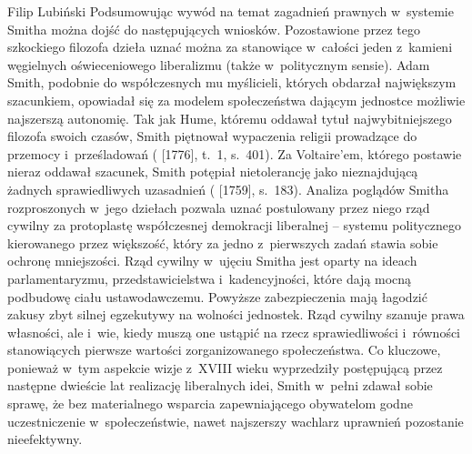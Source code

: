 \begin{artplenv}{Filip Lubiński}
Podsumowując wywód na temat zagadnień prawnych w~systemie Smitha można dojść do następujących wniosków.
Pozostawione przez tego szkockiego filozofa dzieła uznać można za stanowiące w~całości jeden z~kamieni węgielnych oświeceniowego
liberalizmu (także w~politycznym sensie). Adam Smith, podobnie do współczesnych mu myślicieli, których obdarzał
największym szacunkiem, opowiadał się za modelem społeczeństwa dającym jednostce możliwie najszerszą autonomię. Tak jak
Hume, któremu oddawał tytuł najwybitniejszego filozofa swoich czasów, Smith piętnował wypaczenia religii prowadzące do
przemocy i~prześladowań
(\cite{smith_badania_2007} [1776], t.~1, s.~401).
Za Voltaire'em, którego postawie
nieraz oddawał szacunek, Smith potępiał nietolerancję jako nieznajdującą żadnych sprawiedliwych uzasadnień
(\cite{smith_teoria_1989} [1759], s.~183).
Analiza poglądów Smitha rozproszonych w~jego dziełach pozwala
uznać postulowany przez niego rząd cywilny za protoplastę współczesnej demokracji liberalnej -- systemu politycznego
kierowanego przez większość, który za jedno z~pierwszych zadań stawia sobie ochronę mniejszości. Rząd cywilny w~ujęciu
Smitha jest oparty na ideach parlamentaryzmu, przedstawicielstwa i~kadencyjności, które dają mocną podbudowę ciału
ustawodawczemu. Powyższe zabezpieczenia mają łagodzić zakusy zbyt silnej egzekutywy na wolności jednostek. Rząd cywilny
szanuje prawa własności, ale i~wie, kiedy muszą one ustąpić na rzecz sprawiedliwości i~równości stanowiących pierwsze
wartości zorganizowanego społeczeństwa. Co kluczowe, ponieważ w~tym aspekcie wizje z~XVIII wieku wyprzedziły
postępującą przez następne dwieście lat realizację liberalnych idei, Smith w~pełni zdawał sobie sprawę, że bez
materialnego wsparcia zapewniającego obywatelom godne uczestniczenie w~społeczeństwie, nawet najszerszy wachlarz
uprawnień pozostanie nieefektywny.

\end{artplenv}\label{lub-stop}

